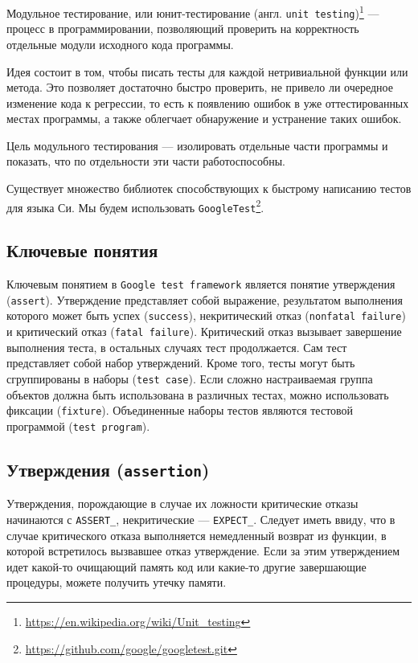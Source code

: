 \documentclass[12pt, twoside]{report}
\begin{document}
Модульное тестирование, или юнит-тестирование (англ. \texttt{unit testing})\footnote{\url{ https://en.wikipedia.org/wiki/Unit_testing}} — процесс в программировании, 
позволяющий проверить на корректность отдельные модули исходного кода программы.

Идея состоит в том, чтобы писать тесты для каждой нетривиальной функции или метода. Это позволяет достаточно быстро проверить, 
не привело ли очередное изменение кода к регрессии, то есть к появлению ошибок в уже оттестированных местах программы, а также облегчает обнаружение и 
устранение таких ошибок.

Цель модульного тестирования — изолировать отдельные части программы и показать, что по отдельности эти части работоспособны.


Существует множество библиотек способствующих к быстрому написанию тестов для языка Си. Мы будем использовать \texttt{GoogleTest}\footnote{\url{ https://github.com/google/googletest.git}}.


\subsection*{Ключевые понятия}

Ключевым понятием в \texttt{Google test framework} является понятие утверждения (\texttt{assert}). Утверждение представляет собой выражение, результатом выполнения 
которого может быть успех (\texttt{success}), некритический отказ (\texttt{nonfatal failure}) и критический отказ (\texttt{fatal failure}). Критический отказ вызывает 
завершение выполнения теста, в остальных случаях тест продолжается. Сам тест представляет собой набор утверждений. Кроме того, тесты могут быть сгруппированы в 
наборы (\texttt{test case}). Если сложно настраиваемая группа объектов должна быть использована в различных тестах, можно использовать фиксации 
(\texttt{fixture}). Объединенные наборы тестов являются тестовой программой (\texttt{test program}).

\subsection*{Утверждения (\texttt{assertion})}

Утверждения, порождающие в случае их ложности критические отказы начинаются с \texttt{ASSERT\_}, некритические — \texttt{EXPECT\_}. Следует иметь ввиду, что в случае 
критического отказа выполняется немедленный возврат из функции, в которой встретилось вызвавшее отказ утверждение. Если за этим утверждением идет какой-то 
очищающий память код или какие-то другие завершающие процедуры, можете получить утечку памяти.
\end{document}
